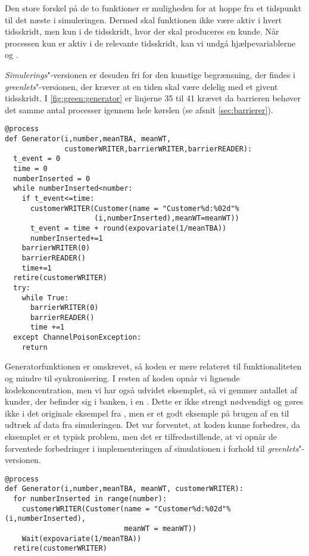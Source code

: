 Den store forskel på de to funktioner er muligheden for at hoppe fra et tidspunkt til det næste i simuleringen. Dermed skal funktionen ikke være aktiv i hvert tidsskridt, men kun i de tidsskridt, hvor der skal produceres en kunde. Når processen kun er aktiv i de relevante tidsskridt, kan vi undgå hjælpevariablerne  og . 

\emph{Simulerings}"-versionen er desuden fri for den kunstige begrænsning, der findes i \emph{greenlets}"-versionen, der kræver at en tiden skal være delelig med et givent tidsskridt. I \cref{fig:green:generator} er linjerne 35 til 41 krævet da barrieren behøver det samme antal processer igennem hele kørslen (se afsnit \cref{sec:barrierer}). 

\begin{lstlisting}[firstnumber=21, label=fig:green:generator, caption=Generatorprocessen for \emph{greenlets}-versionen]
@process
def Generator(i,number,meanTBA, meanWT,
              customerWRITER,barrierWRITER,barrierREADER):
  t_event = 0
  time = 0
  numberInserted = 0
  while numberInserted<number:
    if t_event<=time:
      customerWRITER(Customer(name = "Customer%d:%02d"%
                     (i,numberInserted),meanWT=meanWT))
      t_event = time + round(expovariate(1/meanTBA))
      numberInserted+=1
    barrierWRITER(0)
    barrierREADER()
    time+=1
  retire(customerWRITER)
  try:
    while True:
      barrierWRITER(0)
      barrierREADER()
      time +=1
  except ChannelPoisonException: 
    return
\end{lstlisting}

Generatorfunktionen er omskrevet, så koden er mere relateret til funktionaliteten og mindre til synkronisering.  I resten af koden opnår vi lignende kodekoncentration, men vi har også udvidet eksemplet, så vi gemmer antallet af kunder, der befinder sig i banken, i en . Dette er ikke strengt nødvendigt og gøres ikke i det originale eksempel fra \simpy, men er et godt eksemple på brugen af en  til udtræk af data fra simuleringen. Det var forventet, at koden kunne forbedres, da eksemplet er et typisk \des problem, men det er tilfredsstillende, at vi opnår de forventede forbedringer i implementeringen af simulationen i forhold til \emph{greenlets}"-versionen.


\begin{lstlisting}[firstnumber=20, label=fig:sim:generator, caption=Generatorprocessen for \emph{simulerings}-versionen]
@process
def Generator(i,number,meanTBA, meanWT, customerWRITER):
  for numberInserted in range(number):
    customerWRITER(Customer(name = "Customer%d:%02d"%(i,numberInserted),
                            meanWT = meanWT))
    Wait(expovariate(1/meanTBA))
  retire(customerWRITER)
\end{lstlisting}

